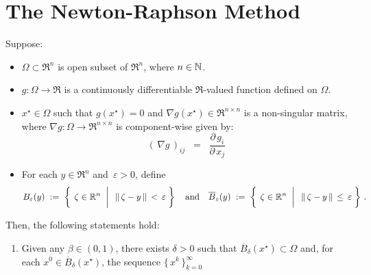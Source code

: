 

\section{The Newton-Raphson Method}
\setcounter{theorem}{0}
\setcounter{equation}{0}

\renewcommand{\theenumi}{\roman{enumi}}
\renewcommand{\labelenumi}{\textnormal{(\theenumi)}$\;\;$}


\begin{theorem}
\mbox{}\vskip 0.1cm
\noindent
Suppose:
\begin{itemize}
\item
	$\Omega \subset \Re^{n}$ is open subset of $\Re^{n}$, where $n \in \mathbb{N}$.
\item
	$g : \Omega \longrightarrow \Re$ is a continuously differentiable $\Re$-valued function
	defined on $\Omega$.
\item
	$x^{\star} \in \Omega$ such that $g(x^{\star}) = 0$ and
	$\nabla g(x^{\star}) \in \Re^{n \times n}$ is a non-singular matrix,
	where $\nabla g : \Omega \longrightarrow \Re^{n \times n}$ is component-wise given by:
	\begin{equation*}
	(\,\nabla g\,)_{ij}
	\;\; = \;\;
		\dfrac{\partial\,g_{i}}{\partial\,x_{j}}
	\end{equation*}
\item
	For each $y \in \Re^{n}$ and \,$\varepsilon > 0$, define
	\begin{equation*}
	B_{\varepsilon}(y)
	\; := \;
		\left\{\;\left.
		\zeta \overset{{\color{white}+}}{\in} \Re^{n}
		\;\;\right\vert\;\;
		\Vert\,\zeta - y\,\Vert \,<\, \varepsilon
		\;\right\}
	\quad\textnormal{and}\quad
	\overline{B}_{\varepsilon}(y)
	\; := \;
		\left\{\;\left.
		\zeta \overset{{\color{white}+}}{\in} \Re^{n}
		\;\;\right\vert\;\;
		\Vert\,\zeta - y\,\Vert \,\leq\, \varepsilon
		\;\right\}\,.
	\end{equation*}
\end{itemize}
Then, the following statements hold:
\begin{enumerate}
\item
	Given any $\beta \in (0,1)$,
	there exists $\delta > 0$ such that $\overline{B}_{\delta}(x^{\star}) \subset \Omega$ and,
	for each $x^{0} \in \overline{B}_{\delta}(x^{\star})$, the sequence $\{\,x^{k}\,\}_{k=0}^{\infty}$

\end{enumerate}
\end{theorem}
